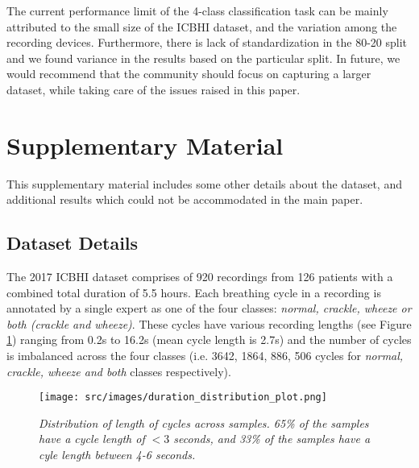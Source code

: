 \documentclass{article}
\begin{document}
The current performance limit of the 4-class classification task can be mainly attributed to the small size of the ICBHI dataset, and the variation among the recording devices. Furthermore, there is lack of standardization in the 80-20 split and we found variance in the results based on the particular split. In future, we would recommend that the community should focus on capturing a larger dataset, while taking care of the issues raised in this paper. 
\clearpage

{\small

}

\clearpage
\section{Supplementary Material}
This supplementary material includes some other details about the dataset, and additional results which could not be accommodated in the main paper.

\subsection{Dataset Details}
The 2017 ICBHI dataset \cite{icbhi_17} comprises of 920 recordings from 126 patients with a combined total duration of 5.5 hours. Each breathing cycle in a recording is annotated by a single expert as one of the four classes: \textit{normal, crackle, wheeze or both (crackle and wheeze)}. These cycles have various recording lengths (see Figure \ref{fig:dist_cycle_length}) ranging from 0.2s to 16.2s (mean cycle length is 2.7s) and the number of cycles is imbalanced across the four classes (i.e. 3642, 1864, 886, 506 cycles for \textit{normal, crackle, wheeze and both} classes respectively).

\begin{figure}[!hbtp]
\begin{center}
    \centering
    \texttt{[image: src/images/duration\_distribution\_plot.png]}
\end{center}
\vspace{-8mm}
    \caption{\textit{Distribution of length of cycles across samples. 65\% of the samples have a cycle length of $<3$ seconds, and 33\% of the samples have a cyle length between 4-6 seconds.}} 
    \label{fig:dist_cycle_length}
\end{figure}
\end{document}
